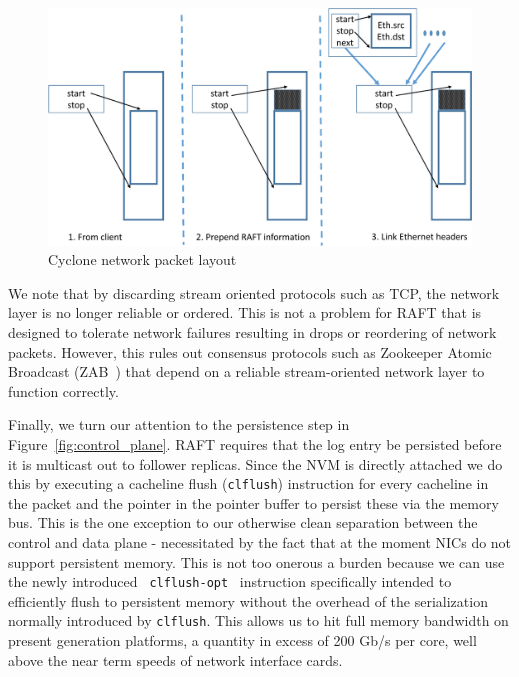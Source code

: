 \documentclass[10pt, preprint, nonatbib]{sigplanconf}
\begin{document}
\begin{figure}
  \centering
  \includegraphics[scale=0.35]{figures2/network_packet.pdf}
  \caption{Cyclone network packet layout}
  \label{fig:packet_layout}
\end{figure}

We note that by discarding stream oriented protocols such as TCP, the network
layer is no longer reliable or ordered. This is not a problem for RAFT that is
designed to tolerate network failures resulting in drops or reordering of
network packets. However, this rules out consensus protocols such as Zookeeper
Atomic Broadcast (ZAB~\cite{zab}) that depend on a reliable stream-oriented
network layer to function correctly.

Finally, we turn our attention to the persistence step in
Figure~\ref{fig:control_plane}. RAFT requires that the log entry be persisted
before it is multicast out to follower replicas. Since the NVM is directly
attached we do this by executing a cacheline flush ({\tt clflush}) instruction
for every cacheline in the packet and the pointer in the pointer buffer to
persist these via the memory bus. This is the one exception to our otherwise
clean separation between the control and data plane - necessitated by the fact
that at the moment NICs do not support persistent memory. This is not too
onerous a burden because we can use the newly introduced {\tt
  clflush-opt}~\cite{clflush_opt} instruction specifically intended to
efficiently flush to persistent memory without the overhead of the serialization
normally introduced by {\tt clflush}. This allows us to hit full memory
bandwidth on present generation platforms, a quantity in excess of 200 Gb/s per
core, well above the near term speeds of network interface cards.
\end{document}
